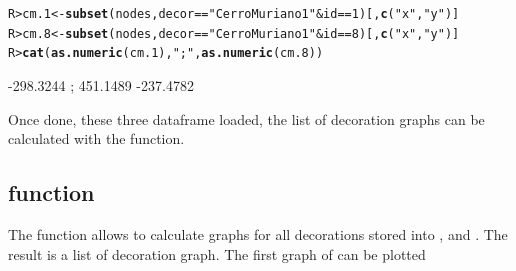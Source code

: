 \documentclass[article]{jss}\usepackage[]{graphicx}\usepackage[]{color}
\makeatletter
\newcommand{\hlnum}[1]{\textcolor[rgb]{0.686,0.059,0.569}{#1}}%
\newcommand{\hlstr}[1]{\textcolor[rgb]{0.192,0.494,0.8}{#1}}%
\newcommand{\hlopt}[1]{\textcolor[rgb]{0,0,0}{#1}}%
\newcommand{\hlstd}[1]{\textcolor[rgb]{0.345,0.345,0.345}{#1}}%
\newcommand{\hlkwb}[1]{\textcolor[rgb]{0.69,0.353,0.396}{#1}}%
\newcommand{\hlkwd}[1]{\textcolor[rgb]{0.737,0.353,0.396}{\textbf{#1}}}%
\newenvironment{kframe}{%
 \def\at@end@of@kframe{}%
 \ifinner\ifhmode%
  \def\at@end@of@kframe{\end{minipage}}%
  \begin{minipage}{\columnwidth}%
 \fi\fi%
 \def\FrameCommand##1{\hskip\@totalleftmargin \hskip-\fboxsep
 \colorbox{shadecolor}{##1}\hskip-\fboxsep
     \hskip-\linewidth \hskip-\@totalleftmargin \hskip\columnwidth}%
 \MakeFramed {\advance\hsize-\width
   \@totalleftmargin\z@ \linewidth\hsize
   \@setminipage}}%
 {\par\unskip\endMakeFramed%
 \at@end@of@kframe}
\makeatother
\begin{document}
\begin{kframe}
\begin{alltt}
\hlstd{R> }\hlstd{cm.1} \hlkwb{<-} \hlkwd{subset}\hlstd{(nodes, decor} \hlopt{==} \hlstr{"Cerro Muriano 1"} \hlopt{&} \hlstd{id} \hlopt{==} \hlnum{1}\hlstd{)[,}\hlkwd{c}\hlstd{(}\hlstr{"x"}\hlstd{,}\hlstr{"y"}\hlstd{)]}
\hlstd{R> }\hlstd{cm.8} \hlkwb{<-} \hlkwd{subset}\hlstd{(nodes, decor} \hlopt{==} \hlstr{"Cerro Muriano 1"} \hlopt{&} \hlstd{id} \hlopt{==} \hlnum{8}\hlstd{)[,}\hlkwd{c}\hlstd{(}\hlstr{"x"}\hlstd{,}\hlstr{"y"}\hlstd{)]}
\hlstd{R> }\hlkwd{cat}\hlstd{(}\hlkwd{as.numeric}\hlstd{(cm.1),}\hlstr{";"}\hlstd{,}\hlkwd{as.numeric}\hlstd{(cm.8))}
\end{alltt}
\end{kframe}349.8148 -298.3244 ; 451.1489 -237.4782

Once done, these three dataframe loaded, the list of decoration graphs can be calculated with the  function.

\subsection{ function} \label{sec:funlistdec}

The  function allows to calculate graphs for all decorations stored into ,  and . The result is a list of decoration graph. The first graph of can be plotted
\end{document}
